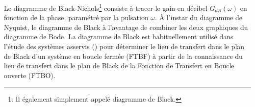 Le diagramme de Black-Nichols\footnote{Il également simplement appelé diagramme de Black.} 
consiste à tracer le gain en décibel $G_{dB}(\omega)$ 
en fonction de la phase, paramétré par la pulsation $\omega$. À l'instar du diagramme de Nyquist, le diagramme 
de Black à l'avantage de combiner les deux graphiques du diagramme de Bode.
La diagramme de Black est habituellement utilisé dans l'étude des systèmes asservis () 
pour déterminer le lieu de transfert dans le plan de Black d'un système en boucle fermée (FTBF) à partir 
de la connaissance du lieu de transfert dans le plan de Black de la Fonction de Transfert en Boucle ouverte (FTBO).


